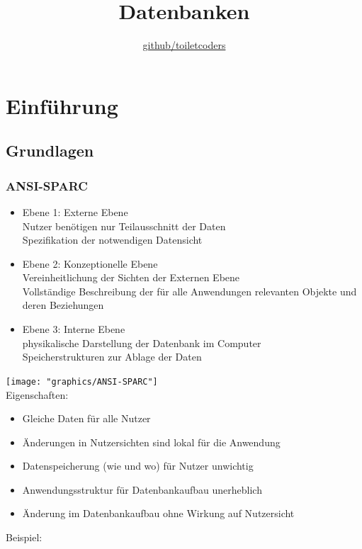 \documentclass{scrreprt}
\title{\textbf{Datenbanken}}
\author{\href{https://github.com/toiletcoders}{\color{black}github/toiletcoders}}
\date{}
\begin{document}
\maketitle
\pagebreak
\renewcommand{\contentsname}{Inhaltsverzeichnis}
\setcounter{tocdepth}{1}
\tableofcontents
{}
\pagebreak
{}
\chapter{Einführung}
\section{Grundlagen}
\subsection{ANSI-SPARC}
\begin{itemize}
  \item Ebene 1: Externe Ebene
  \\Nutzer benötigen nur Teilausschnitt der Daten
  \\Spezifikation der notwendigen Datensicht
  \item Ebene 2: Konzeptionelle Ebene 
  \\Vereinheitlichung der Sichten der Externen Ebene 
  \\Vollständige Beschreibung der für alle Anwendungen relevanten Objekte und deren Beziehungen
  \item Ebene 3: Interne Ebene
  \\physikalische Darstellung der Datenbank im Computer
  \\Speicherstrukturen zur Ablage der Daten
\end{itemize}
\texttt{[image: "graphics/ANSI-SPARC"]}
\\Eigenschaften:
\begin{itemize}
  \item Gleiche Daten für alle Nutzer
  \item Änderungen in Nutzersichten sind lokal für die Anwendung
  \item Datenspeicherung (wie und wo) für Nutzer unwichtig
  \item Anwendungsstruktur für Datenbankaufbau unerheblich
  \item Änderung im Datenbankaufbau ohne Wirkung auf Nutzersicht
\end{itemize}
Beispiel:
\end{document}
